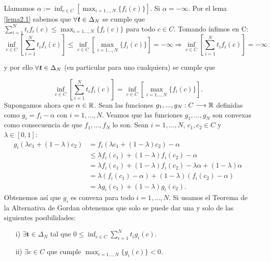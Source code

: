 	Llamamos $ \alpha := \inf_{ c\in C}\left[\max_{i=1\dots,N } \{f_i(c)\} \right] $. Si $ \alpha = -\infty $. Por el lema \ref{lema2.1} sabemos que $ \forall \textbf{\emph{t}} \in \Delta_N $ se cumple que $ \sum_{i=1}^{N} t_i f_i(c) \leq \max_{i=1\dots,N } \{f_i(c)\}$ para todo $ c \in C$. Tomando ínfimos en C:
	\[
	\inf_{c \in C}\left[ \sum_{i=1}^{N} t_i f_i(c) \right] \leq \inf_{ c\in C}\left[\max_{i=1\dots,N } \{f_i(c)\} \right] = -\infty \Longrightarrow \inf_{ c \in C}\left[ \sum_{i=1}^{N} t_i f_i (c)\right] = -\infty 
	\]
	
	y por ello $ \forall \textbf{\emph{t}} \in \Delta_N $ (en particular para uno cualquiera) se cumple que
	
	\[
	\inf_{c \in C}\left[ \sum_{i=1}^{N} t_i f_i (c) \right] = \inf_{ c\in C}\left[\max_{i=1\dots,N } \{f_i(c)\} \right]. \]
	Supongamos ahora que $ \alpha \in \mathbb{R} $. Sean las funciones $ g_1, ..., g_N: C \longrightarrow \mathbb{R} $ definidas como $ g_i = f_i - \alpha $ con $ i=1,...,N$. Veamos que las funciones $ g_1, ..., g_N $ son convexas como consecuencia de que $ f_1, ..., f_N $ lo son. Sean $ i = 1, \dots, N $, $ c_1,c_2 \in C $ y $ \lambda \in \left[0,1\right] $:
	\begin{equation*}
	\begin{split}
	g_i(\lambda c_1 + (1-\lambda) c_2) &= f_i(\lambda c_1 + (1-\lambda) c_2) - \alpha \\
	&\leq \lambda f_i(c_1) + (1-\lambda)f_i(c_2) - \alpha \\
	&= \lambda f_i(c_1) + (1-\lambda)f_i(c_2) - \lambda \alpha + (1-\lambda)\alpha \\
	&= \lambda( f_i(c_1) - \alpha ) + (1-\lambda) (f_i (c_2) - \alpha) \\
	&= \lambda g_i(c_1) + (1-\lambda) g_i (c_2).
	\end{split}
	\end{equation*}
	Obtenemos así que $ g_i $ es convexa para todo $ i = 1, ..., N $. Si usamos el Teorema de la Alternativa de Gordan obtenemos que solo se puede dar una y solo de las siguientes posibilidades:
	
	\begin{itemize}
		\item[i)] $ \exists \mathbf{t} \in \Delta_N $ tal que $ 0 \leq \inf_{c \in C}  \sum_{i=1}^{N}{t_i g_i (c)}$.
		\item[ii)] $ \exists c \in C $ que cumple $ \max_{i=1\dots,N } \{g_i(c)\}  < 0 $.
	\end{itemize}
	
